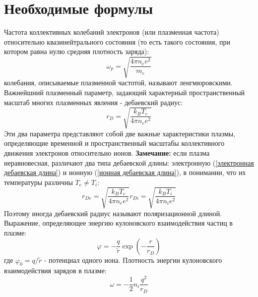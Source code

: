 \documentclass[a4paper, 12pt]{article}
\begin{document}
\section*{Необходимые формулы}
Частота коллективных колебаний электронов (или плазменная частота) относительно квазинейтрального состояния (то есть такого состояния, при котором равна нулю средняя
плотность заряда):
\begin{equation}
    \omega_{p} = \sqrt{\frac{4\pi n_{e}e^{2}}{m_{e}}}
    \label{частота коллективных колебаний}
\end{equation}
колебания, описываемые плазменной частотой, называют ленгмюровскими.\newline
Важнейшний плазменный параметр, задающий характерный пространственный масштаб многих плазменных явления - дебаевский радиус:
\begin{equation}
    r_{D} = \sqrt{\frac{k_{B}T_{e}}{4\pi n_{e}e^{2}}}
    \label{дебаевский радиус основной}
\end{equation}
Эти два  параметра представляют собой две важные характеристики плазмы, определяющие временной и пространственный масштабы коллективного
движения электронов относительно ионов.
\textbf{Замечание:} если плазма неравновесная, различают два типа дебаевской длины: электронную (\ref{электронная дебаевская длина}) и ионную (\ref{ионная дебаевская длина}),
в понимании, что их температуры различны $T_{e} \neq T_{i}$:
\begin{subequations}
    \begin{equation}
        r_{De} = \sqrt{\frac{k_{B}T_{e}}{4\pi n_{e}e^{2}}}
        \label{электронная дебаевская длина}
    \end{equation}
    \begin{equation}
        r_{Di} = \sqrt{\frac{k_{B}T_{i}}{4\pi n_{i}e^{2}}}
        \label{ионная дебаевская длина}
    \end{equation}
\end{subequations}
Поэтому иногда дебаевский радиус называют поляризационной длиной.\newline
Выражение, определяющее энергию кулоновского взаимодействия частиц в плазме:
\begin{equation}
    \varphi = -\frac{q}{\tilde{r}}\exp\left(-\frac{r}{r_{D}}\right)
    \label{энергия кулоновского взаимодействия}
\end{equation}
где $\varphi_{0} = q/\tilde{r}$ - потенциал одного иона.\newline
Плотность энергии кулоновского взаимодействия зарядов в плазме:
\begin{equation}
    \omega = -\frac{1}{2}n_{i}\frac{q^2}{r_{D}}
    \label{плотность энергии кулоновского взаимодействия}
\end{equation}
\end{document}
